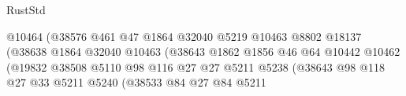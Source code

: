 \begin{lexlean}{RustStd}
\begin{coremodule}
                                                  @10464
                                                  (@38576
                                                    @461
                                                    @47
                                                    @1864
                                                    @32040
                                                    @5219
                                                    @10463
                                                    @8802
                                                    @18137
                                                    (@38638
                                                      @1864
                                                      @32040
                                                      @10463
                                                      (@38643
                                                        @1862
                                                        @1856
                                                        @46
                                                        @64
                                                        @10442
                                                        @10462
                                                        (@19832
                                                          @38508
                                                          @5110
                                                          @98
                                                          @116
                                                          @27
                                                          @27
                                                          @5211
                                                          @5238
                                                          (@38643
                                                            @98
                                                            @118
                                                            @27
                                                            @33
                                                            @5211
                                                            @5240
                                                            (@38533
                                                              @84
                                                              @27
                                                              @84
                                                              @5211

\end{coremodule}
\end{lexlean}
